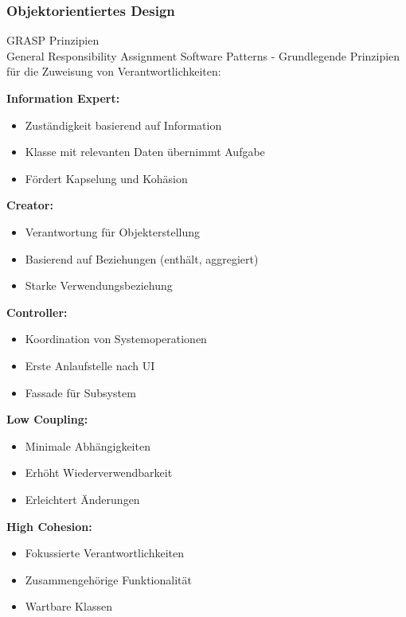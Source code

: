 \pagebreak












\subsubsection{Objektorientiertes Design}

\begin{concept}{GRASP Prinzipien}\\
General Responsibility Assignment Software Patterns - Grundlegende Prinzipien für die Zuweisung von Verantwortlichkeiten:

\textbf{Information Expert:}
\begin{itemize}
    \item Zuständigkeit basierend auf Information
    \item Klasse mit relevanten Daten übernimmt Aufgabe
    \item Fördert Kapselung und Kohäsion
\end{itemize}

\textbf{Creator:}
\begin{itemize}
    \item Verantwortung für Objekterstellung
    \item Basierend auf Beziehungen (enthält, aggregiert)
    \item Starke Verwendungsbeziehung
\end{itemize}

\textbf{Controller:}
\begin{itemize}
    \item Koordination von Systemoperationen
    \item Erste Anlaufstelle nach UI
    \item Fassade für Subsystem
\end{itemize}

\textbf{Low Coupling:}
\begin{itemize}
    \item Minimale Abhängigkeiten
    \item Erhöht Wiederverwendbarkeit
    \item Erleichtert Änderungen
\end{itemize}

\textbf{High Cohesion:}
\begin{itemize}
    \item Fokussierte Verantwortlichkeiten
    \item Zusammengehörige Funktionalität
    \item Wartbare Klassen
\end{itemize}
\end{concept}

